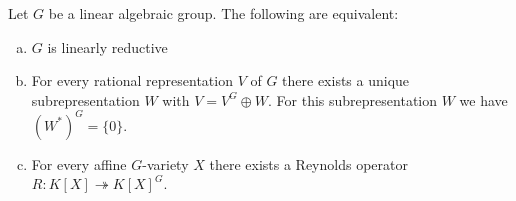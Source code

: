 \begin{theorem}\label{equiv}
  Let $G$ be a linear algebraic group.
  The following are equivalent:
  \begin{enumerate}[(a)]
  \item $G$ is linearly reductive
  \item For every rational representation $V$ of $G$ there exists a unique subrepresentation $W$ with $V = V^G \oplus W$.
    For this subrepresentation $W$ we have $(W^\ast)^G = \{0\}$.
  \item For every affine $G$-variety $X$ there exists a Reynolds operator $R \colon K[X] \twoheadrightarrow K[X]^G $.
  \end{enumerate}
\end{theorem}

